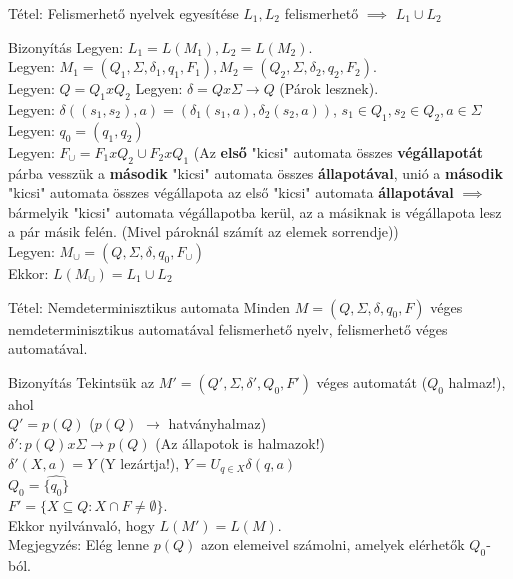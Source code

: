 \documentclass{beamer}
\begin{document}
\begin{frame}
\begin{block}{Tétel: Felismerhető nyelvek egyesítése}
$L_1, L_2$ felismerhető $\implies$ $L_1 \cup L_2$

\end{block}

\begin{block}{Bizonyítás}
Legyen: $L_1 = L(M_1), L_2 = L(M_2)$.\\
Legyen: $M_1 = (Q_1, \Sigma , {\delta}_1, q_1, F_1), M_2 = (Q_2, \Sigma , {\delta}_2, q_2, F_2)$.\\
Legyen: $Q = Q_1 x Q_2$
Legyen: $\delta = Q x \Sigma \rightarrow Q$ (Párok lesznek).\\
Legyen: $\delta((s_1, s_2), a) = ({\delta}_1(s_1, a), {\delta}_2(s_2, a))$, $s_1 \in Q_1, s_2 \in Q_2, a \in \Sigma$\\
\bigskip
Legyen: $q_0 = (q_1, q_2)$\\
Legyen: \underline{\textbf{$F_{\cup} = F_1 x Q_2 \cup F_2 x Q_1$}} (Az \textbf{első} "kicsi" automata összes \textbf{végállapotát} párba vesszük a \textbf{második} "kicsi" automata összes \textbf{állapotával}, unió a \textbf{második} "kicsi" automata összes végállapota az első "kicsi" automata \textbf{állapotával} $\implies$ bármelyik "kicsi" automata végállapotba kerül, az a másiknak is végállapota lesz a pár másik felén. (Mivel pároknál számít az elemek sorrendje))\\
\smallskip
Legyen: $M_{\cup} = (Q, \Sigma , \delta , q_0, F_{\cup})$\\
\bigskip
Ekkor: \underline{$L(M_{\cup}) = L_1 \cup L_2$}\\
\end{block}

\end{frame}

\begin{frame}
\begin{block}{Tétel: Nemdeterminisztikus automata}
Minden $M = (Q, \Sigma , \delta , q_0, F)$ véges nemdeterminisztikus automatával felismerhető nyelv, felismerhető véges automatával.

\end{block}

\begin{block}{Bizonyítás}
Tekintsük az $M' = (Q', \Sigma , {\delta}', Q_0, F')$ véges automatát ($Q_0$ halmaz!), ahol\\
$Q' = p(Q)$ ($p(Q)$ $\rightarrow$ hatványhalmaz)\\
${\delta}' : p(Q) x \Sigma \rightarrow p(Q)$ (Az állapotok is halmazok!)\\
${\delta}'(X, a) = \widehat{Y}$ (Y lezártja!), $Y = U_{q \in X} \delta(q, a)$\\
$Q_0 = \widehat{\{q_0\}}$\\
$F' = \{X \subseteq Q : X \cap F \neq \emptyset \}$.\\
Ekkor nyilvánvaló, hogy $L(M') = L(M)$.\\
Megjegyzés: Elég lenne $p(Q)$ azon elemeivel számolni, amelyek elérhetők $Q_0$-ból.

\end{block}

\end{frame}
\end{document}
